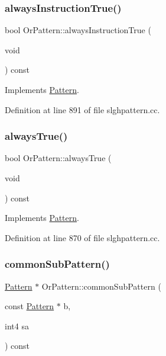 \subsubsection{\texorpdfstring{alwaysInstructionTrue()}{alwaysInstructionTrue()}}
{\footnotesize\ttfamily bool Or\+Pattern\+::always\+Instruction\+True (\begin{DoxyParamCaption}\item[{void}]{ }\end{DoxyParamCaption}) const\hspace{0.3cm}{\ttfamily [virtual]}}



Implements \mbox{\hyperlink{class_pattern_a62dd2f6b8bbb33279586739924ba4fa9}{Pattern}}.



Definition at line 891 of file slghpattern.\+cc.

\mbox{\label{class_or_pattern_a22c4506e990fb885136d8684e01bcde1}} 
\subsubsection{\texorpdfstring{alwaysTrue()}{alwaysTrue()}}
{\footnotesize\ttfamily bool Or\+Pattern\+::always\+True (\begin{DoxyParamCaption}\item[{void}]{ }\end{DoxyParamCaption}) const\hspace{0.3cm}{\ttfamily [virtual]}}



Implements \mbox{\hyperlink{class_pattern_ab1527189c63b797a70c23047c033d35f}{Pattern}}.



Definition at line 870 of file slghpattern.\+cc.

\mbox{\label{class_or_pattern_a298d0540c485a3e056410848a4870c92}} 
\subsubsection{\texorpdfstring{commonSubPattern()}{commonSubPattern()}}
{\footnotesize\ttfamily \mbox{\hyperlink{class_pattern}{Pattern}} $\ast$ Or\+Pattern\+::common\+Sub\+Pattern (\begin{DoxyParamCaption}\item[{const \mbox{\hyperlink{class_pattern}{Pattern}} $\ast$}]{b,  }\item[{int4}]{sa }\end{DoxyParamCaption}) const\hspace{0.3cm}{\ttfamily [virtual]}}




